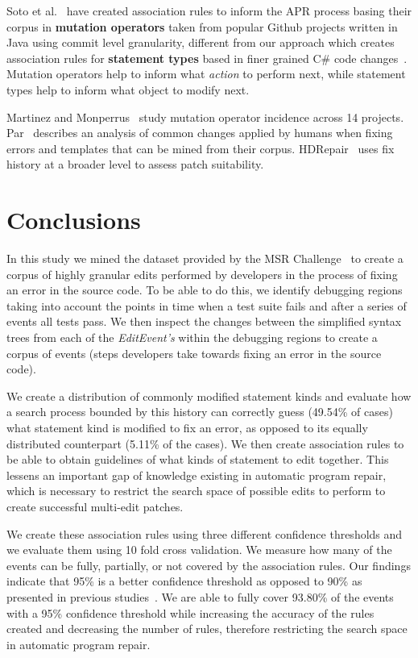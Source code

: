 \documentclass[sigconf]{acmart}
\begin{document}
Soto et al.~\cite{Soto18} have created association rules to inform the APR
process basing their corpus in \textbf{mutation operators} taken from popular Github projects
written in Java using commit level granularity, 
different from our approach which creates association rules for \textbf{statement types} 
based in finer grained C\# code changes~\cite{msr18challenge}. Mutation operators help to 
inform what \textit{action} to perform next, while statement types help to inform what
object to modify next. 

Martinez and
Monperrus~\cite{martinez15} study mutation operator incidence across 
14 projects. Par~\cite{kim2013} describes an analysis of common changes
applied by humans when fixing errors and templates that can be mined from
their corpus. HDRepair~\cite{xuan16} 
uses fix history at a broader level
to assess patch suitability.


\section{Conclusions}
\label{conclusions}
In this study we mined the dataset provided by the MSR Challenge~\cite{msr18challenge}
to create a corpus of highly granular edits performed by developers in the process
of fixing an error in the source code. To be able to do this, we identify debugging
regions taking into account the points in time when a test suite fails and after a 
series of events all tests pass. We then inspect the changes between the simplified 
syntax trees from each
of the \textit{EditEvent's} within the debugging regions to create a corpus of 
events (steps developers take towards fixing an error in the source code).

We create a distribution of commonly modified statement kinds and evaluate
how a search process bounded by this history can correctly guess (49.54\% of 
cases) what statement kind is modified to fix an error, as opposed to its
equally distributed counterpart (5.11\% of the cases).
We then create association rules to be able to obtain guidelines of what kinds of
statement to edit together. This lessens an important gap of knowledge existing
in automatic program repair, which is necessary to restrict the search space of 
possible edits to perform to create successful multi-edit patches.

We create these association rules using three different confidence thresholds and
we evaluate them using 10 fold cross validation. We measure how many of the events
can be fully, partially, or not covered by the association rules.
Our findings indicate that 95\% is a better confidence threshold as 
opposed to 90\% as presented in previous studies~\cite{Soto18}. 
We are able to fully cover 93.80\% of the events with a 95\% confidence threshold
while increasing the accuracy of the rules created and decreasing the 
number of rules, therefore restricting the search space in automatic program repair.
\end{document}
